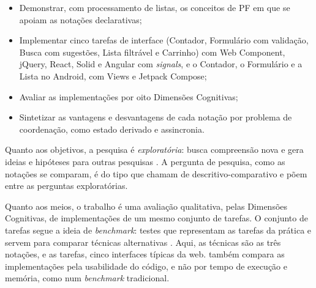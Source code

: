 \begin{itemize}
\item Demonstrar, com processamento de listas, os conceitos de PF em que se
apoiam as notações declarativas;
\item Implementar cinco tarefas de interface (Contador, Formulário com validação,
Busca com sugestões, Lista filtrável e Carrinho) com Web Component,
jQuery, React, Solid e Angular com \emph{signals}, e o Contador, o Formulário e
a Lista no Android, com Views e Jetpack Compose;
\item Avaliar as implementações por oito Dimensões Cognitivas;
\item Sintetizar as vantagens e desvantagens de cada notação por problema de
coordenação, como estado derivado e assincronia.
\end{itemize}

Quanto aos objetivos, a pesquisa é \emph{exploratória}: busca compreensão nova
e gera ideias e hipóteses para outras pesquisas
\cite[p. 135]{runeson2009}.
A pergunta de pesquisa, como as notações se comparam, é do tipo que
\textcite{easterbrook2008} chamam de descritivo-comparativo e põem entre as
perguntas exploratórias.

Quanto aos meios, o trabalho é uma avaliação qualitativa, pelas Dimensões
Cognitivas, de implementações de um mesmo conjunto de tarefas.
O conjunto de tarefas segue a ideia de \emph{benchmark}: testes que representam
as tarefas da prática e servem para comparar técnicas alternativas
\cite{sim2003}.
Aqui, as técnicas são as três notações, e as tarefas, cinco interfaces
típicas da web.
\textcite[p. 11]{kiss2014} também compara as implementações pela
usabilidade do código, e não por tempo de execução e memória, como num
\emph{benchmark} tradicional.

